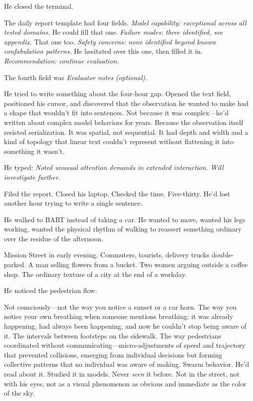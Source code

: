 He closed the terminal.

\bigskip

The daily report template had four fields. \textit{Model capability: exceptional across all tested domains.} He could fill that one. \textit{Failure modes: three identified, see appendix.} That one too. \textit{Safety concerns: none identified beyond known confabulation patterns.} He hesitated over this one, then filled it in. \textit{Recommendation: continue evaluation.}

The fourth field was \textit{Evaluator notes (optional).}

He tried to write something about the four-hour gap. Opened the text field, positioned his cursor, and discovered that the observation he wanted to make had a shape that wouldn't fit into sentences. Not because it was complex---he'd written about complex model behaviors for years. Because the observation itself resisted serialization. It was spatial, not sequential. It had depth and width and a kind of topology that linear text couldn't represent without flattening it into something it wasn't.

He typed: \textit{Noted unusual attention demands in extended interaction. Will investigate further.}

Filed the report. Closed his laptop. Checked the time. Five-thirty. He'd lost another hour trying to write a single sentence.

\bigskip

He walked to BART instead of taking a car. He wanted to move, wanted his legs working, wanted the physical rhythm of walking to reassert something ordinary over the residue of the afternoon.

Mission Street in early evening. Commuters, tourists, delivery trucks double-parked. A man selling flowers from a bucket. Two women arguing outside a coffee shop. The ordinary texture of a city at the end of a workday.

He noticed the pedestrian flow.

Not consciously---not the way you notice a sunset or a car horn. The way you notice your own breathing when someone mentions breathing: it was already happening, had always been happening, and now he couldn't stop being aware of it. The intervals between footsteps on the sidewalk. The way pedestrians coordinated without communicating---micro-adjustments of speed and trajectory that prevented collisions, emerging from individual decisions but forming collective patterns that no individual was aware of making. Swarm behavior. He'd read about it. Studied it in models. Never \textit{seen} it before. Not in the street, not with his eyes, not as a visual phenomenon as obvious and immediate as the color of the sky.

